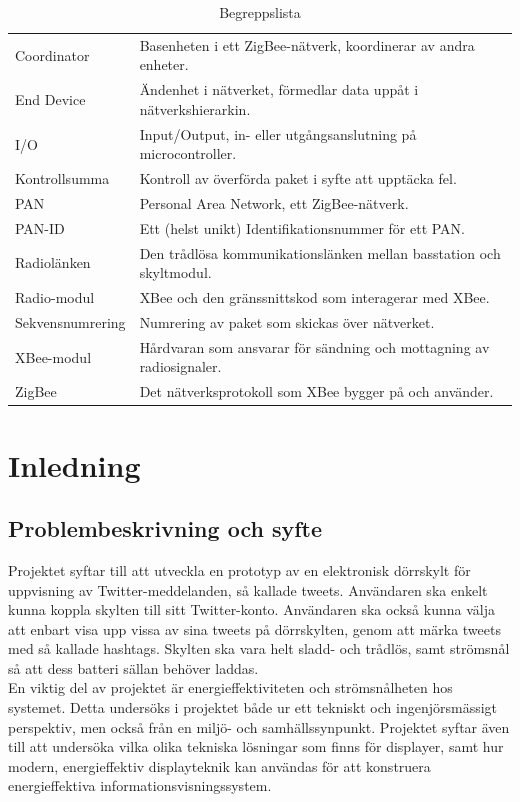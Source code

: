 \documentclass[a4paper,11pt]{article}
\begin{document}
\begin{table}[h]
\begin{tabular}{|l|l|}
Coordinator & Basenheten i ett ZigBee-nätverk, koordinerar av andra enheter.\\
End Device & Ändenhet i nätverket, förmedlar data uppåt i nätverkshierarkin.\\
I/O & Input/Output, in- eller utgångsanslutning på microcontroller.\\
Kontrollsumma & Kontroll av överförda paket i syfte att upptäcka fel.\\
PAN & Personal Area Network, ett ZigBee-nätverk.\\
PAN-ID & Ett (helst unikt) Identifikationsnummer för ett PAN.\\
Radiolänken & Den trådlösa kommunikationslänken mellan basstation och skyltmodul.\\
Radio-modul & XBee och den gränssnittskod som interagerar med XBee.\\
Sekvensnumrering & Numrering av paket som skickas över nätverket.\\
XBee-modul & Hårdvaran som ansvarar för sändning och mottagning av radiosignaler.\\
ZigBee & Det nätverksprotokoll som XBee bygger på och använder.\\
	\end{tabular}
\caption{Begreppslista}
\label{tab:begreppstable}
\end{table}

\thispagestyle{empty}
\pagebreak

\thispagestyle{empty}
\tableofcontents
\thispagestyle{empty}
\pagebreak

\setcounter{page}{1}
\section{Inledning}

\subsection{Problembeskrivning och syfte}
Projektet syftar till att utveckla en prototyp av en elektronisk dörrskylt för uppvisning av Twitter-meddelanden, så kallade tweets. Användaren ska enkelt kunna koppla skylten till sitt Twitter-konto. Användaren ska också kunna välja att enbart visa upp vissa av sina tweets på dörrskylten, genom att märka tweets med så kallade hashtags. Skylten ska vara helt sladd- och trådlös, samt strömsnål så att dess batteri sällan behöver laddas. \\

En viktig del av projektet är energieffektiviteten och strömsnålheten hos systemet. Detta undersöks i projektet både ur ett tekniskt och ingenjörsmässigt perspektiv, men också från en miljö- och samhällssynpunkt. Projektet syftar även till att undersöka vilka olika tekniska lösningar som finns för displayer, samt hur modern, energieffektiv displayteknik kan användas för att konstruera energieffektiva informationsvisningssystem. \\
\end{document}

